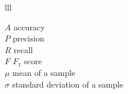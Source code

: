 \documentclass[
11pt, %
oneside, %
english, %
singlespacing, %
headsepline, %
]{MastersDoctoralThesis} %
\begin{document}
\begin{symbols}{lll} %

$A$ accuracy \\
$P$ precision \\ 
$R$ recall \\
$F$ $F_1$ score \\
$\mu$ mean of a sample \\ 
$\sigma$ standard deviation of a sample \\



\end{symbols}




\mainmatter %

\pagestyle{thesis} %



 

 
 
 
 

\end{document}
